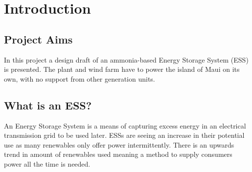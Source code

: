 

\section{Introduction}
\subsection{Project Aims}

In this project a design draft of an ammonia-based Energy Storage System (ESS) is presented.
The plant and wind farm have to power the island of Maui on its own, with no support from other generation units.


\subsection{What is an ESS?}

An Energy Storage System is a means of capturing excess energy in an electrical transmission grid to be used later.
ESSs are seeing an increase in their potential use as many renewables only offer power intermittently. There is an upwards trend in amount of renewables used \cite{intro:growth} meaning a method to supply consumers power all the time is needed.

